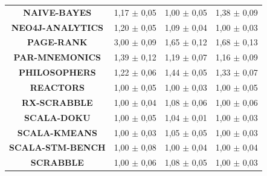 \documentclass[]{usiinfthesis}
\begin{document}
\begin{table}
\begin{tabular}{|c|c|c|c|}
\textbf{	NAIVE-BAYES	}&	 1,17 	 $\pm$ 	 0,05 	 & 	 1,00 	 $\pm$ 	 0,05 	 & 	 1,38 	 $\pm$ 	 0,09 	\\
\textbf{	NEO4J-ANALYTICS	}&	 1,20 	 $\pm$ 	 0,05 	 & 	 1,09 	 $\pm$ 	 0,04 	 & 	 1,00 	 $\pm$ 	 0,03 	\\
\textbf{	PAGE-RANK	}&	 3,00 	 $\pm$ 	 0,09 	 & 	 1,65 	 $\pm$ 	 0,12 	 & 	 1,68 	 $\pm$ 	 0,13 	\\
\textbf{	PAR-MNEMONICS	}&	 1,39 	 $\pm$ 	 0,12 	 & 	 1,19 	 $\pm$ 	 0,07 	 & 	 1,16 	 $\pm$ 	 0,09 	\\
\textbf{	PHILOSOPHERS	}&	 1,22 	 $\pm$ 	 0,06 	 & 	 1,44 	 $\pm$ 	 0,05 	 & 	 1,33 	 $\pm$ 	 0,07 	\\
\textbf{	REACTORS	}&	 1,00 	 $\pm$ 	 0,05 	 & 	 1,00 	 $\pm$ 	 0,03 	 & 	 1,00 	 $\pm$ 	 0,05 	\\
\textbf{	RX-SCRABBLE	}&	 1,00 	 $\pm$ 	 0,04 	 & 	 1,08 	 $\pm$ 	 0,06 	 & 	 1,00 	 $\pm$ 	 0,06 	\\
\textbf{	SCALA-DOKU	}&	 1,00 	 $\pm$ 	 0,05 	 & 	 1,04 	 $\pm$ 	 0,01 	 & 	 1,00 	 $\pm$ 	 0,03 	\\
\textbf{	SCALA-KMEANS	}&	 1,00 	 $\pm$ 	 0,03 	 & 	 1,05 	 $\pm$ 	 0,05 	 & 	 1,00 	 $\pm$ 	 0,03 	\\
\textbf{	SCALA-STM-BENCH	}&	 1,00 	 $\pm$ 	 0,08 	 & 	 1,00 	 $\pm$ 	 0,04 	 & 	 1,00 	 $\pm$ 	 0,04 	\\
\textbf{	SCRABBLE	}&	 1,00 	 $\pm$ 	 0,06 	 & 	 1,08 	 $\pm$ 	 0,05 	 & 	 1,00 	 $\pm$ 	 0,03 	\\
\hline
\end{tabular}
\end{table}%
\end{document}
